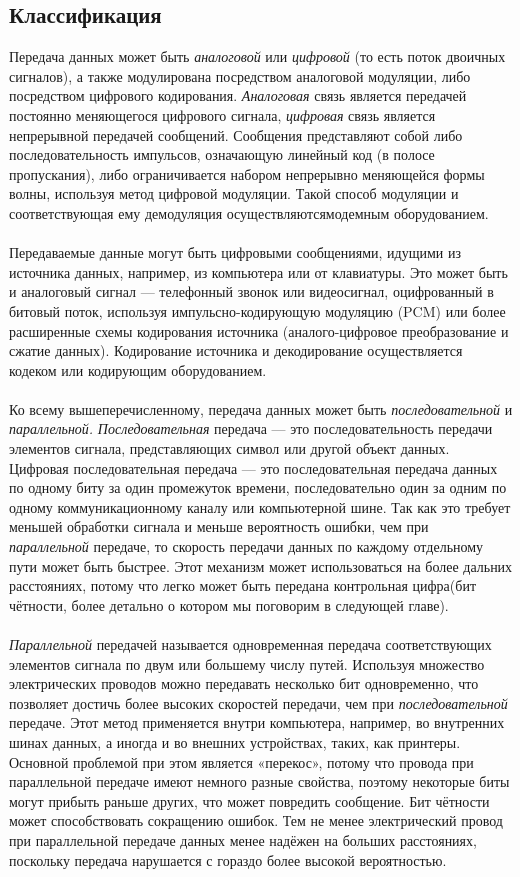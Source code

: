 \subsection{Классификация}
Передача данных может быть \emph{аналоговой} или \emph{цифровой} (то есть поток двоичных сигналов), а также модулирована посредством аналоговой модуляции, либо посредством цифрового кодирования. \emph{Аналоговая} связь является передачей постоянно меняющегося цифрового сигнала, \emph{цифровая} связь является непрерывной передачей сообщений. Сообщения представляют собой либо последовательность импульсов, означающую линейный код (в полосе пропускания), либо ограничивается набором непрерывно меняющейся формы волны, используя метод цифровой модуляции. Такой способ модуляции и соответствующая ему демодуляция осуществляютсямодемным оборудованием.\\
\\Передаваемые данные могут быть цифровыми сообщениями, идущими из источника данных, например, из компьютера или от клавиатуры. Это может быть и аналоговый сигнал — телефонный звонок или видеосигнал, оцифрованный в битовый поток, используя импульсно-кодирующую модуляцию (PCM) или более расширенные схемы кодирования источника (аналого-цифровое преобразование и сжатие данных). Кодирование источника и декодирование осуществляется кодеком или кодирующим оборудованием.\\
\\ Ко всему вышеперечисленному, передача данных может быть \emph{последовательной} и \emph{параллельной.} \emph{Последовательная} передача — это последовательность передачи элементов сигнала, представляющих символ или другой объект данных. Цифровая последовательная передача — это последовательная передача данных по одному биту за один промежуток времени, последовательно один за одним по одному коммуникационному каналу или компьютерной шине. Так как это требует меньшей обработки сигнала и меньше вероятность ошибки, чем при \emph{параллельной} передаче, то скорость передачи данных по каждому отдельному пути может быть быстрее. Этот механизм может использоваться на более дальних расстояниях, потому что легко может быть передана контрольная цифра(бит чётности, более детально о котором мы поговорим в следующей главе).\\
\\\emph{Параллельной} передачей называется одновременная передача соответствующих элементов сигнала по двум или большему числу путей. Используя множество электрических проводов можно передавать несколько бит одновременно, что позволяет достичь более высоких скоростей передачи, чем при \emph{последовательной} передаче. Этот метод применяется внутри компьютера, например, во внутренних шинах данных, а иногда и во внешних устройствах, таких, как принтеры. Основной проблемой при этом является «перекос», потому что провода при параллельной передаче имеют немного разные свойства, поэтому некоторые биты могут прибыть раньше других, что может повредить сообщение. Бит чётности может способствовать сокращению ошибок. Тем не менее электрический провод при параллельной передаче данных менее надёжен на больших расстояниях, поскольку передача нарушается с гораздо более высокой вероятностью.

